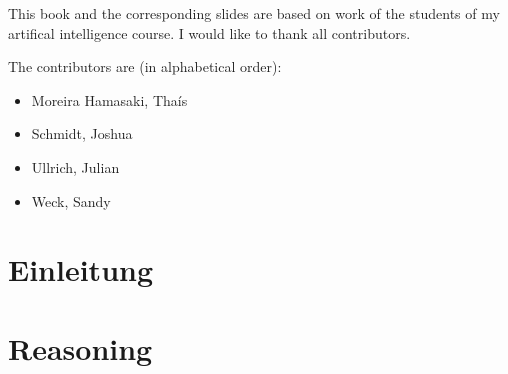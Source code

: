 \documentclass[11pt,fleqn]{book} %
\begin{document}


\newpage
\thispagestyle{empty}

\noindent This book and the corresponding slides are based on work of the students of my artifical intelligence course. I would like to thank all contributors.

\noindent
The contributors are (in alphabetical order):
\begin{itemize}
    \item Moreira Hamasaki, Thaís
    \item Schmidt, Joshua
    \item Ullrich, Julian
    \item Weck, Sandy
\end{itemize}





\pagestyle{empty} %

\tableofcontents %

\cleardoublepage %

\pagestyle{fancy} %

\part{Einleitung}


\part{Reasoning}


\end{document}
